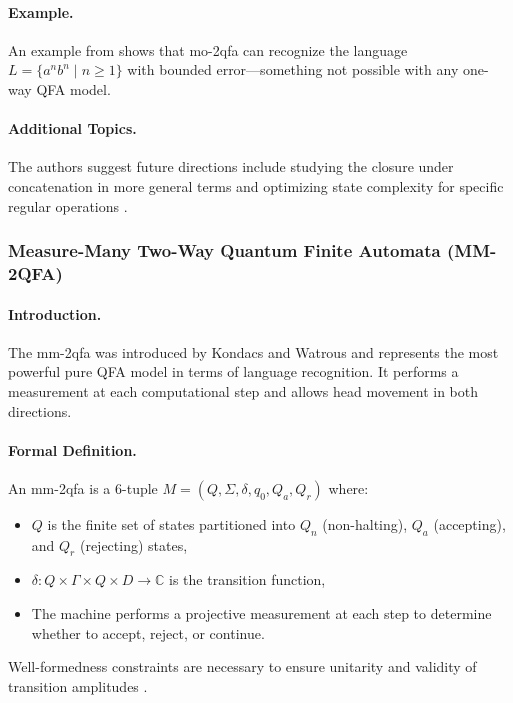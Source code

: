 \paragraph{Example.} An example from \cite{xi2008some} shows that \gls{mo-2qfa} can recognize the language $L = \{ a^nb^n \mid n \geq 1 \}$ with bounded error—something not possible with any one-way QFA model.

\paragraph{Additional Topics.} The authors suggest future directions include studying the closure under concatenation in more general terms and optimizing state complexity for specific regular operations \cite{xi2008some}.

\subsubsection{Measure-Many Two-Way Quantum Finite Automata (MM-2QFA)}

\paragraph{Introduction.} The \gls{mm-2qfa} was introduced by Kondacs and Watrous \cite{kondacs1997power} and represents the most powerful pure QFA model in terms of language recognition. It performs a measurement at each computational step and allows head movement in both directions.

\paragraph{Formal Definition.} An \gls{mm-2qfa} is a 6-tuple $M = (Q, \Sigma, \delta, q_0, Q_a, Q_r)$ where:
\begin{itemize}
    \item $Q$ is the finite set of states partitioned into $Q_n$ (non-halting), $Q_a$ (accepting), and $Q_r$ (rejecting) states,
    \item $\delta: Q \times \Gamma \times Q \times D \to \mathbb{C}$ is the transition function,
    \item The machine performs a projective measurement at each step to determine whether to accept, reject, or continue.
\end{itemize}
Well-formedness constraints are necessary to ensure unitarity and validity of transition amplitudes \cite{kondacs1997power}.

